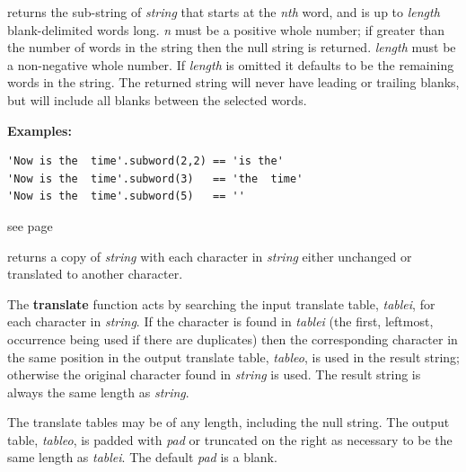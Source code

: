 \begin{description}
\item[subword(n [,length{]})]\label{refsubword}
returns the sub-string of \emph{string} that starts at the
\emph{n}\emph{th} word, and is up to \emph{length} blank-delimited
words long.
\emph{n} must be a positive whole number; if greater than the number
of words in the string then the null string is returned.
\emph{length} must be a non-negative whole number.
If \emph{length} is omitted it defaults to be the remaining words
in the string.
The returned string will never have leading or trailing blanks, but
will include all blanks between the selected words.
 
\textbf{Examples:}
\begin{lstlisting}
'Now is the  time'.subword(2,2) == 'is the'
'Now is the  time'.subword(3)   == 'the  time'
'Now is the  time'.subword(5)   == ''
\end{lstlisting}

\item[time()] see page \pageref{refrexxtime}
\index{,}
\item[translate(tableo, tablei [,pad{]})]\label{reftrans}
returns a copy of \emph{string} with each character in
\emph{string} either unchanged or translated to another character.
 
The \textbf{translate} function acts by searching the input translate
table, \emph{tablei}, for each character in \emph{string}.
If the character is found in \emph{tablei} (the first, leftmost,
occurrence being used if there are duplicates) then the corresponding
character in the same position in the output translate table,
\emph{tableo}, is used in the result string; otherwise the original
character found in \emph{string} is used.
The result string is always the same length as \emph{string}.
 
The translate tables may be of any length, including the null string.
The output table, \emph{tableo}, is padded with \emph{pad} or
truncated on the right as necessary to be the same length as
\emph{tablei}.
The default \emph{pad} is a blank.
 

\end{description}
